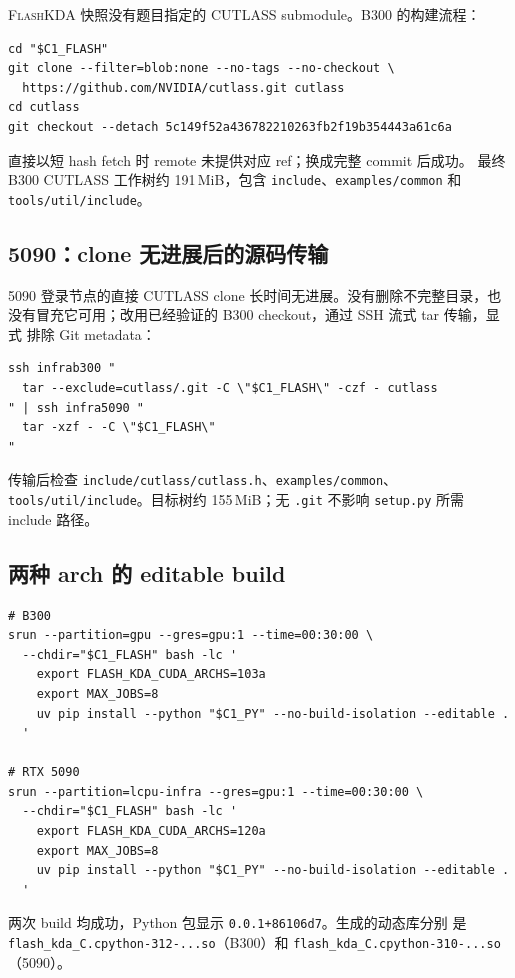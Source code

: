 \documentclass[11pt,a4paper,fontset=none]{ctexart}
\newcommand{\FlashKDA}{\textsc{FlashKDA}}
\newcommand{\code}[1]{\texttt{#1}}
\begin{document}
\FlashKDA{} 快照没有题目指定的 CUTLASS submodule。B300 的构建流程：

\begin{lstlisting}
cd "$C1_FLASH"
git clone --filter=blob:none --no-tags --no-checkout \
  https://github.com/NVIDIA/cutlass.git cutlass
cd cutlass
git checkout --detach 5c149f52a436782210263fb2f19b354443a61c6a
\end{lstlisting}

直接以短 hash fetch 时 remote 未提供对应 ref；换成完整 commit 后成功。
最终 B300 CUTLASS 工作树约 191\,MiB，包含
\code{include}、\code{examples/common} 和 \code{tools/util/include}。

\subsection{5090：clone 无进展后的源码传输}

5090 登录节点的直接 CUTLASS clone 长时间无进展。没有删除不完整目录，也
没有冒充它可用；改用已经验证的 B300 checkout，通过 SSH 流式 tar 传输，显式
排除 Git metadata：

\begin{lstlisting}
ssh infrab300 "
  tar --exclude=cutlass/.git -C \"$C1_FLASH\" -czf - cutlass
" | ssh infra5090 "
  tar -xzf - -C \"$C1_FLASH\"
"
\end{lstlisting}

传输后检查 \code{include/cutlass/cutlass.h}、\code{examples/common}、
\code{tools/util/include}。目标树约 155\,MiB；无 \code{.git} 不影响
\code{setup.py} 所需 include 路径。

\subsection{两种 arch 的 editable build}

\begin{lstlisting}
# B300
srun --partition=gpu --gres=gpu:1 --time=00:30:00 \
  --chdir="$C1_FLASH" bash -lc '
    export FLASH_KDA_CUDA_ARCHS=103a
    export MAX_JOBS=8
    uv pip install --python "$C1_PY" --no-build-isolation --editable .
  '

# RTX 5090
srun --partition=lcpu-infra --gres=gpu:1 --time=00:30:00 \
  --chdir="$C1_FLASH" bash -lc '
    export FLASH_KDA_CUDA_ARCHS=120a
    export MAX_JOBS=8
    uv pip install --python "$C1_PY" --no-build-isolation --editable .
  '
\end{lstlisting}

两次 build 均成功，Python 包显示 \code{0.0.1+86106d7}。生成的动态库分别
是 \code{flash\_kda\_C.cpython-312-...so}（B300）和
\code{flash\_kda\_C.cpython-310-...so}（5090）。
\end{document}
